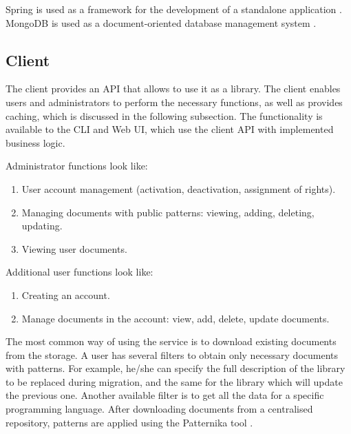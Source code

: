 \documentclass[letterpaper, 10 pt, conference]{ieeeconf}  %
\begin{document}
Spring is used as a framework for the development of a standalone 
application \cite{c5}.
MongoDB is used as a document-oriented database management system \cite{c6}. 

\subsection{Client}
The client provides an API that allows to use it as a library.
The client enables users and administrators to perform the necessary functions,
as well as provides caching, which is discussed in the following subsection. 
The functionality is available to the CLI and Web UI, which use the client API
with implemented business logic.

Administrator functions look like:
\begin{enumerate}
    \item User account management (activation, deactivation, assignment of
    rights).
    \item Managing documents with public patterns: viewing, adding, deleting,
    updating.
    \item Viewing user documents.
\end{enumerate}

Additional user functions look like:
\begin{enumerate}
    \item Creating an account.
    \item Manage documents in the account: view, add, delete, update documents.
\end{enumerate}

The most common way of using the service is to download existing documents 
from the storage. 
A user has several filters to obtain only necessary documents with patterns. 
For example, he/she can specify the full description of the library to be
replaced during migration, and the same for the library which will update 
the previous one. 
Another available filter is to get all the data for a specific programming
language. 
After downloading documents from a centralised repository, patterns are 
applied using the Patternika tool \cite{c1}. 
\end{document}
